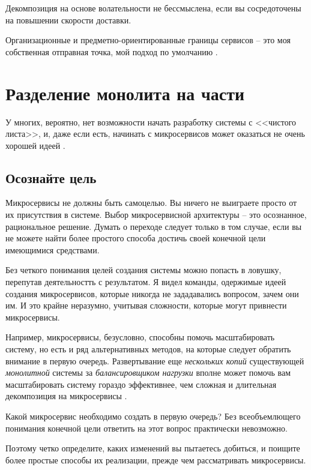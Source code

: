 \documentclass[%
	11pt,
	a4paper,
	utf8,
		]{article}
\begin{document}
Декомпозиция на основе волательности не бессмыслена, если вы сосредоточены на повышении скорости доставки.

Организационные и предметно-ориентированные границы сервисов -- это моя собственная отправная точка, мой подход по умолчанию \cite[]{microservices-2024}.

\section{Разделение монолита на части}

У многих, вероятно, нет возможности начать разработку системы с <<чистого листа>>, и, даже если есть, начинать с микросервисов может оказаться не очень хорошей идеей \cite[]{microservices-2024}.

\subsection{Осознайте цель}

Микросервисы не должны быть самоцелью. Вы ничего не выиграете просто от их присутствия в системе. Выбор микросервисной архитектуры -- это осознанное, рациональное решение. Думать о переходе следует только в том случае, если вы не можете найти более простого способа достичь своей конечной цели имеющимися средствами.

Без четкого понимания целей создания системы можно попасть в ловушку, перепутав деятельностть с результатом. Я видел команды, одержимые идеей создания микросервисов, которые никогда не зададавались вопросом, зачем они им. И это крайне неразумно, учитывая сложности, которые могут привнести микросервисы.

Например, микросервисы, безусловно, способны помочь масштабировать систему, но есть и ряд альтернативных методов, на которые следует обратить внимание в первую очередь. Развертывание еще \emph{нескольких копий} существующей \emph{монолитной} системы за \emph{балансировщиком нагрузки} вполне может помочь вам масштабировать систему гораздо эффективнее, чем сложная и длительная декомпозиция на микросервисы \cite[]{microservices-2024}.

Какой микросервис необходимо создать в первую очередь? Без всеобъемлющего понимания конечной цели ответить на этот вопрос практически невозможно.

Поэтому четко определите, каких изменений вы пытаетесь добиться, и поищите более простые способы их реализации, прежде чем рассматривать микросервисы.
\end{document}
